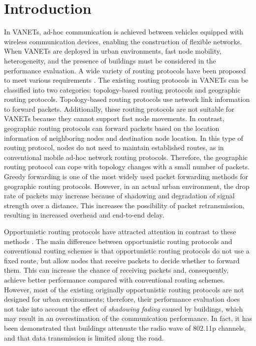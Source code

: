 \documentclass[conference]{IEEEtran}
\begin{document}
\section{Introduction}
In VANETs,  ad-hoc communication is achieved between vehicles equipped with wireless communication devices, enabling the construction of flexible networks. 
When VANETs are deployed in  urban environments, fast node mobility, heterogeneity, and the presence of buildings must be considered in the performance evaluation. A wide variety of routing protocols have been proposed to meet various requirements \cite{2}.
The existing routing protocols in VANETs can be classified into two categories: topology-based routing protocols and geographic routing protocols. Topology-based routing protocols \cite{3,4} use network link information to forward packets. 
Additionally, these routing protocols are not suitable for VANETs because they cannot support fast node movements. In contrast, geographic routing protocols \cite{6, 7,9} can forward packets based on the location information of neighboring nodes and destination node location. 
In this type of routing protocol, nodes do not need to maintain established routes, as in conventional mobile ad-hoc network routing protocols. 
Therefore, the geographic routing protocol can cope with topology changes with a small number of packets.
Greedy forwarding is one of the most widely used packet forwarding methods for geographic routing protocols.
However, in an actual urban environment, the drop rate of packets may increase because of shadowing and degradation of signal strength over a distance. This increases the possibility of packet retransmission, resulting in increased overhead and end-to-end delay. 


Opportunistic routing protocols have attracted attention in contrast to these methods \cite{16}. 
The main difference between opportunistic routing protocols and conventional routing schemes is that opportunistic routing protocols do not use a fixed route, but allow nodes that receive packets to decide whether to forward them. 
This can increase the chance of receiving packets and, consequently, achieve better performance compared with conventional routing schemes.
However, most of the existing originally opportunistic routing protocols  are not designed for urban environments; therefore, their performance evaluation does not take into account the effect of \textit{shadowing fading} caused by buildings, which may result in an overestimation of the communication performance. 
In fact, it has been demonstrated that buildings attenuate the radio wave of 802.11p channels, and that data transmission is limited along the road\cite{17}. 
\end{document}
